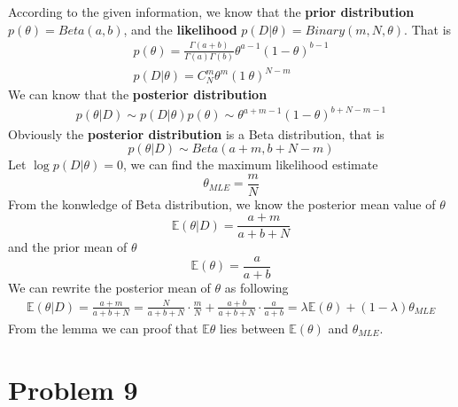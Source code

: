 \documentclass[12pt]{scrartcl}
\newcommand\E{\mathbb{E}}
\begin{document}
  According to the given information, we know that the \textbf{prior distribution} \(p(\theta) = Beta(a, b)\), and the \textbf{likelihood} \(p(D|\theta) = Binary(m, N, \theta)\). That is
  \[
    \begin{split}
      p(\theta) = \frac{\Gamma(a + b)}{\Gamma(a)\Gamma(b)}\theta^{a - 1}(1 - \theta)^{b - 1}  \\
      p(D|\theta) = C_N^m\theta^m(1 \ \theta)^{N - m}
    \end{split}  
  \]
  We can know that the \textbf{posterior distribution}
  \[
    \begin{split}
      p(\theta|D) \sim p(D|\theta)p(\theta) \sim \theta^{a + m - 1}(1 - \theta)^{b + N - m - 1}
    \end{split}
  \]
  Obviously the \textbf{posterior distribution} is a Beta distribution, that is
  \[
    p(\theta|D) \sim Beta(a+m, b+N-m)
  \]
  Let \(\log p(D|\theta) = 0\), we can find the maximum likelihood estimate
  \[
    \theta_{MLE} = \frac{m}{N}
  \]
  From the konwledge of Beta distribution, we know the posterior mean value of \(\theta\)
  \[
    \E(\theta|D) = \frac{a+m}{a + b + N}
  \] 
  and the prior mean of \(\theta\)
  \[
    \E(\theta) = \frac{a}{a + b}
  \]
  We can rewrite the posterior mean of \(\theta\) as following
  \[
    \begin{split}
      \E(\theta|D) = \frac{a+m}{a + b + N} = \frac{N}{a+b+N} \cdot \frac{m}{N} + \frac{a+b}{a+b+N} \cdot \frac{a}{a + b}
      = \lambda \E(\theta) + (1-\lambda)\theta_{MLE}
    \end{split}
  \]
  From the lemma we can proof that $\E{\theta}$ lies between $\E(\theta)$ and $\theta_{MLE}$.
  
  \section*{Problem 9}
  
\end{document}
